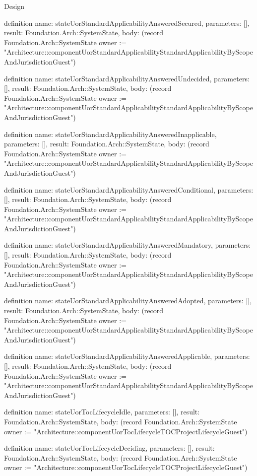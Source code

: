\begin{lexlean}{Design}
\begin{semanticmodule}
definition{
  name: stateUorStandardApplicabilityAnsweredSecured,
  parameters: [],
  result: Foundation.Arch::SystemState,
  body: (record Foundation.Arch::SystemState {owner := "Architecture::componentUorStandardApplicabilityStandardApplicabilityByScopeAndJurisdictionGuest"})
}

definition{
  name: stateUorStandardApplicabilityAnsweredUndecided,
  parameters: [],
  result: Foundation.Arch::SystemState,
  body: (record Foundation.Arch::SystemState {owner := "Architecture::componentUorStandardApplicabilityStandardApplicabilityByScopeAndJurisdictionGuest"})
}

definition{
  name: stateUorStandardApplicabilityAnsweredInapplicable,
  parameters: [],
  result: Foundation.Arch::SystemState,
  body: (record Foundation.Arch::SystemState {owner := "Architecture::componentUorStandardApplicabilityStandardApplicabilityByScopeAndJurisdictionGuest"})
}

definition{
  name: stateUorStandardApplicabilityAnsweredConditional,
  parameters: [],
  result: Foundation.Arch::SystemState,
  body: (record Foundation.Arch::SystemState {owner := "Architecture::componentUorStandardApplicabilityStandardApplicabilityByScopeAndJurisdictionGuest"})
}

definition{
  name: stateUorStandardApplicabilityAnsweredMandatory,
  parameters: [],
  result: Foundation.Arch::SystemState,
  body: (record Foundation.Arch::SystemState {owner := "Architecture::componentUorStandardApplicabilityStandardApplicabilityByScopeAndJurisdictionGuest"})
}

definition{
  name: stateUorStandardApplicabilityAnsweredAdopted,
  parameters: [],
  result: Foundation.Arch::SystemState,
  body: (record Foundation.Arch::SystemState {owner := "Architecture::componentUorStandardApplicabilityStandardApplicabilityByScopeAndJurisdictionGuest"})
}

definition{
  name: stateUorStandardApplicabilityAnsweredApplicable,
  parameters: [],
  result: Foundation.Arch::SystemState,
  body: (record Foundation.Arch::SystemState {owner := "Architecture::componentUorStandardApplicabilityStandardApplicabilityByScopeAndJurisdictionGuest"})
}

definition{
  name: stateUorTocLifecycleIdle,
  parameters: [],
  result: Foundation.Arch::SystemState,
  body: (record Foundation.Arch::SystemState {owner := "Architecture::componentUorTocLifecycleTOCProjectLifecycleGuest"})
}

definition{
  name: stateUorTocLifecycleDeciding,
  parameters: [],
  result: Foundation.Arch::SystemState,
  body: (record Foundation.Arch::SystemState {owner := "Architecture::componentUorTocLifecycleTOCProjectLifecycleGuest"})
}


\end{semanticmodule}
\end{lexlean}
